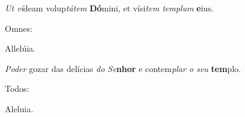 \begin{greenumerate}
  \setcounter{enumi}{1}


  \item \textit{Ut ví}deam volup\textit{tátem} \textbf{Dó}mini, {\GreStar} et vísi\textit{tem templum} \textbf{e}ius. \begin{rubrica}Omnes:\end{rubrica} Allelúia.

  \switchcolumn\setcounter{enumi}{1}

  \item \textit{Poder} gozar das delícias \textit{do Se}\textbf{nhor} {\GreStar} e contem\textit{plar o seu} \textbf{tem}plo. \begin{rubrica}Todos:\end{rubrica} Aleluia.
\end{greenumerate}